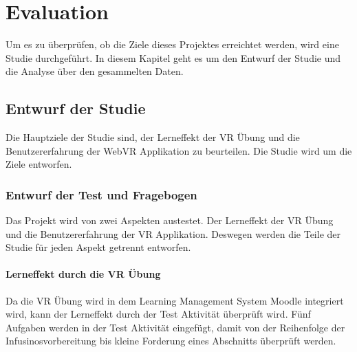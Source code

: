 \chapter{Evaluation}

Um es zu überprüfen, ob die Ziele dieses Projektes erreichtet werden, wird eine Studie durchgeführt. In diesem Kapitel geht es um den Entwurf der Studie und die Analyse über den gesammelten Daten.

\section{Entwurf der Studie}

Die Hauptziele der Studie sind, der Lerneffekt der VR Übung und die Benutzererfahrung der WebVR Applikation zu beurteilen. Die Studie wird um die Ziele entworfen.

\subsection{Entwurf der Test und Fragebogen}

Das Projekt wird von zwei Aspekten austestet. Der Lerneffekt der VR Übung und die Benutzererfahrung der VR Applikation. Deswegen werden die Teile der Studie für jeden Aspekt getrennt entworfen.

\subsubsection{Lerneffekt durch die VR Übung}

Da die VR Übung wird in dem Learning Management System Moodle integriert wird, kann der Lerneffekt durch der Test Aktivität überprüft wird. Fünf Aufgaben werden in der Test Aktivität eingefügt, damit von der Reihenfolge der Infusinosvorbereitung bis kleine Forderung eines Abschnitts überprüft werden.


